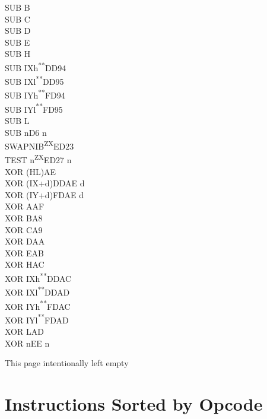\documentclass[12pt,twoside,openright,a4paper]{book}
\newcommand{\UNDOC}{\textnormal{\textsuperscript{**}}}
\newcommand{\ZXN}{\textnormal{\textsuperscript{ZX}}}
\newcommand{\intentiallyempty}{
	\mbox{}
	\vfill
	\begin{center}
	This page intentionally left empty
	\end{center}
	\vfill
	\mbox{}
}
\begin{document}
\begin{multicols}{3}
{\begin{tabbing}
	SUB B\\
	SUB C\\
	SUB D\\
	SUB E\\
	SUB H\\
	SUB IXh\UNDOC\>DD94\\
	SUB IXl\UNDOC\>DD95\\
	SUB IYh\UNDOC\>FD94\\
	SUB IYl\UNDOC\>FD95\\
	SUB L\\
	SUB n\>D6 n\\
	SWAPNIB\ZXN\>ED23\\
	TEST n\ZXN\>ED27 n\\
	XOR (HL)\>AE\\
	XOR (IX+d)\>DDAE d\\
	XOR (IY+d)\>FDAE d\\
	XOR A\>AF\\
	XOR B\>A8\\
	XOR C\>A9\\
	XOR D\>AA\\
	XOR E\>AB\\
	XOR H\>AC\\
	XOR IXh\UNDOC\>DDAC\\
	XOR IXl\UNDOC\>DDAD\\
	XOR IYh\UNDOC\>FDAC\\
	XOR IYl\UNDOC\>FDAD\\
	XOR L\>AD\\
	XOR n\>EE n

	\end{tabbing}
}
\end{multicols}
\normalsize


\pagebreak
\intentiallyempty
\pagebreak


\chapter{Instructions Sorted by Opcode}
\end{document}
